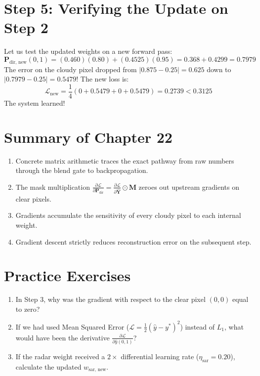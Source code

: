 \section{Step 5: Verifying the Update on Step 2}
Let us test the updated weights on a new forward pass:
\[
\mathbf{P}_{\text{dir, new}}(0, 1) = (0.460)(0.80) + (0.4525)(0.95) = 0.368 + 0.4299 = \mathbf{0.7979}
\]
The error on the cloudy pixel dropped from $|0.875 - 0.25| = 0.625$ down to $|0.7979 - 0.25| = \mathbf{0.5479}$!
The new loss is:
\[
\mathcal{L}_{\text{new}} = \frac{1}{4}(0 + 0.5479 + 0 + 0.5479) = \mathbf{0.2739} < 0.3125
\]
The system learned!

\section{Summary of Chapter 22}
\begin{enumerate}
    \item Concrete matrix arithmetic traces the exact pathway from raw numbers through the blend gate to backpropagation.
    \item The mask multiplication $\frac{\partial \mathcal{L}}{\partial \mathbf{P}_{\text{dir}}} = \frac{\partial \mathcal{L}}{\partial \hat{\mathbf{Y}}} \odot \mathbf{M}$ zeroes out upstream gradients on clear pixels.
    \item Gradients accumulate the sensitivity of every cloudy pixel to each internal weight.
    \item Gradient descent strictly reduces reconstruction error on the subsequent step.
\end{enumerate}

\section{Practice Exercises}
\begin{enumerate}
    \item In Step 3, why was the gradient with respect to the clear pixel $(0, 0)$ equal to zero?
    \item If we had used Mean Squared Error ($\mathcal{L} = \frac{1}{2}(\hat{y} - y^*)^2$) instead of $L_1$, what would have been the derivative $\frac{\partial \mathcal{L}}{\partial \hat{y}(0, 1)}$?
    \item If the radar weight received a $2\times$ differential learning rate ($\eta_{\text{sar}} = 0.20$), calculate the updated $w_{\text{sar, new}}$.
\end{enumerate}

